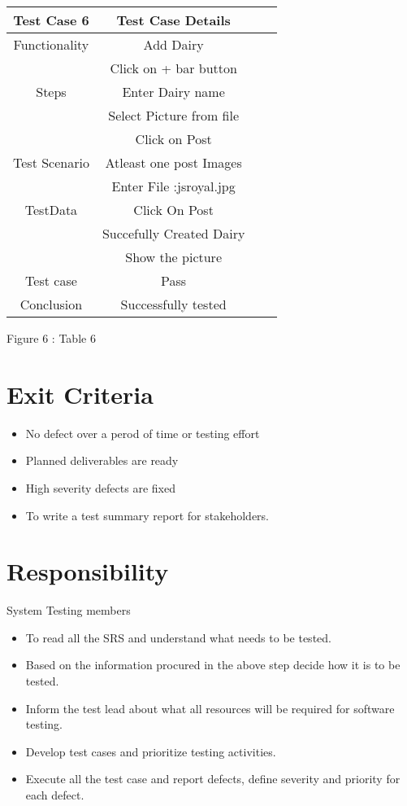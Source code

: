 \documentclass[]{article}
\begin{document}
\begin{center}
\begin{tabular}{ |c|c|c|c| }
\hline
Test Case 6 & Test Case Details  \hspace{4cm}  \\ 
\hline
 Functionality & Add Dairy  \\ 
\hline
\multirow{3}{4em}{Steps} & Click on + bar button   \\ 
& Enter Dairy name  \\
& Select Picture from file  \\
& Click on Post  \\ 
\hline
Test Scenario & Atleast one post Images  \\
\hline
\multirow{3}{4em}{TestData} & Enter File :jsroyal.jpg\\ 
& Click On Post \\ 
\hline
\multirow{3}{4em}{DesireResult} & Succefully Created Dairy  \\ 
& Show the picture \\ 
\hline
Test case &  Pass \\
\hline
Conclusion & Successfully tested \\
\hline
\end{tabular}
\end{center}
\hspace{3.5cm} Figure 6 : Table 6




\section{Exit Criteria}
\begin{itemize}
\item No defect over a perod of time or testing effort
\item Planned deliverables are ready
\item High severity defects are fixed
\item To write a test summary report for stakeholders.
\end{itemize}

\section{Responsibility}
    System Testing members
\begin{itemize}
\item To read all the SRS and understand what needs to be tested.
\item Based on the information procured in the above step decide how it is to be tested.
\item Inform the test lead about what all resources will be required for software testing.
\item Develop test cases and prioritize testing activities.
\item Execute all the test case and report defects, define severity and priority for each defect.

\end{itemize}


  
\end{document}
